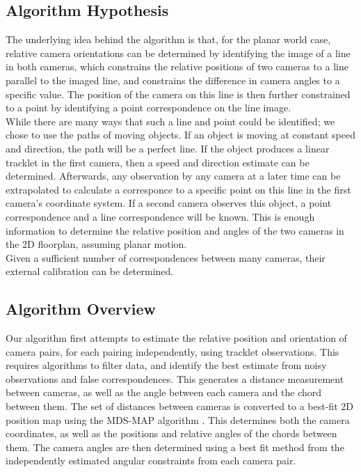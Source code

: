 \documentclass[journal]{IEEEtran}
\begin{document}
	\subsection{Algorithm Hypothesis}
		\indent The underlying idea behind the algorithm is that, for the planar world case, relative camera orientations can be determined by identifying the image of a line in both cameras, which constrains the relative positions of two cameras to a line parallel to the imaged line, and constrains the difference in camera angles to a specific value. The position of the camera on this line is then further constrained to a point by identifying a point correspondence on the line image. \\
		\indent While there are many ways that such a line and point could be identified; we chose to use the paths of moving objects. If an object is moving at constant speed and direction, the path will be a perfect line. If the object produces a linear tracklet in the first camera, then a speed and direction estimate can be determined. Afterwards, any observation by any camera at a later time can be extrapolated to calculate a corresponce to a specific point on this line in the first camera’s coordinate system. If a second camera observes this object, a point correspondence and a line correspondence will be known. This is enough information to determine the relative position and angles of the two cameras in the 2D floorplan, assuming planar motion. \\
		\indent Given a sufficient number of correspondences between many cameras, their external calibration can be determined.
		
	\subsection{Algorithm Overview}
		\indent Our algorithm first attempts to estimate the relative position and orientation of camera pairs, for each pairing independently, using tracklet observations. This requires algorithms to filter data, and identify the best estimate from noisy observations and false correspondences. This generates a distance measurement between cameras, as well as the angle between each camera and the chord between them. The set of distances between cameras is converted to a best-fit 2D position map using the MDS-MAP algorithm \cite{shang2003}. This determines both the camera coordinates, as well as the positions and relative angles of the chords between them. The camera angles are then determined using a best fit method from the independently estimated angular constraints from each camera pair.
\end{document}
